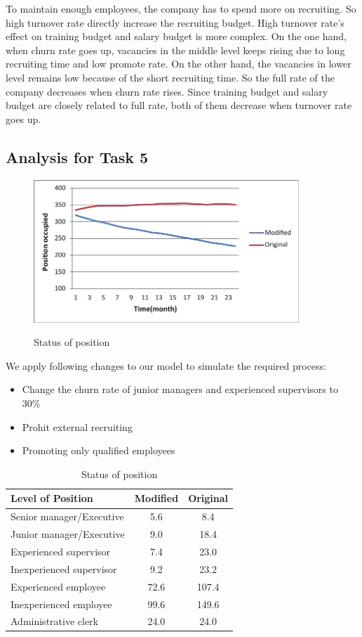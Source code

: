 \documentclass[12pt,a4paper,titlepage]{article}
\begin{document}
To maintain enough employees, the company has to spend more on recruiting. So high turnover rate directly increase the recruiting budget. High turnover rate's effect on training budget and salary budget is more complex. On the one hand, when churn rate goes up, vacancies in the middle level keeps rising due to long recruiting time and low promote rate. On the other hand, the vacancies in lower level remains low because of the short recruiting time. So the full rate of the company decreases when churn rate rises. Since training budget and salary budget are closely related to full rate, both of them decrease when turnover rate goes up.
\subsection{Analysis for Task 5}
\label{sec:analysis-for-task-5}

\begin{figure}[htb]
  \centering
  \includegraphics[width=10cm]{task5_p.pdf}\\
  \caption{Status of position}\label{t5_p}
\end{figure}
We apply following changes to our model to simulate the required process:\\
\begin{itemize}
\item Change the churn rate of junior managers and experienced supervisors to 30\%
\item Prohit external recruiting
\item Promoting only qualified employees
\end{itemize}
\begin{table}
	\begin{center}
		\begin{tabular}{l|cc}\toprule[2pt]
		\bfseries Level of Position & \bfseries Modified & \bfseries Original\\ \midrule
		Senior manager/Executive & 5.6 & 8.4\\
		Junior manager/Executive & 9.0 & 18.4\\
		Experienced supervisor & 7.4 & 23.0\\
		Inexperienced supervisor & 9.2 & 23.2\\
		Experienced employee & 72.6 & 107.4\\
		Inexperienced employee & 99.6 & 149.6\\
		Administrative clerk & 24.0 & 24.0\\ \bottomrule[2pt]
		\end{tabular}
		\caption{Status of position}\label{t5_p_t}
	\end{center}
\end{table}
\end{document}
